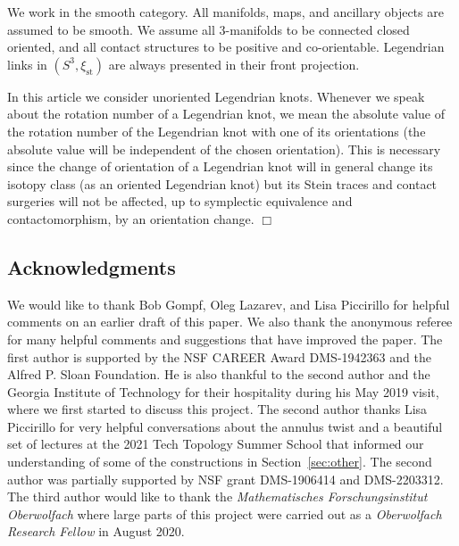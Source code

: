 \documentclass[11pt]{amsart} %
\newcommand{\xist}{\xi_{\mathrm{st}}}
\theoremstyle{plain}
\theoremstyle{definition}
\begin{document}
We work in the smooth category. All manifolds, maps, and ancillary objects are assumed to be smooth. We assume all $3$-manifolds to be connected closed oriented, and all contact structures to be positive and co-orientable. Legendrian links in $(S^3,\xist)$ are always presented in their front projection.

In this article we consider unoriented Legendrian knots. Whenever we speak about the rotation number of a Legendrian knot, we mean the absolute value of the rotation number of the Legendrian knot with one of its orientations (the absolute value will be independent of the chosen orientation). This is necessary since the change of orientation of a Legendrian knot will in general change its isotopy class (as an oriented Legendrian knot) but its Stein traces and contact surgeries will not be affected, up to symplectic equivalence and contactomorphism, by an orientation change.  \hfill$\Box$

\subsection*{Acknowledgments}
We would like to thank Bob Gompf, Oleg Lazarev, and Lisa Piccirillo for helpful comments on an earlier draft of this paper.  We also thank the anonymous referee for many helpful comments and suggestions that have improved the paper. 
The first author is supported by the NSF CAREER Award DMS-1942363 and the Alfred P. Sloan Foundation. He is also thankful to the second author and the Georgia Institute of Technology for their hospitality during his May 2019 visit, where we first started to discuss this project. The second author thanks Lisa Piccirillo for very helpful conversations about the annulus twist and a beautiful set of lectures at the 2021 Tech Topology Summer School that informed our understanding of some of the constructions in Section~\ref{sec:other}.
The second author was partially supported by NSF grant DMS-1906414 and DMS-2203312.
The third author would like to thank the \textit{Mathematisches Forschungsinstitut Oberwolfach} where large parts of this project were carried out as a \textit{Oberwolfach Research Fellow} in August 2020.%





\end{document}
